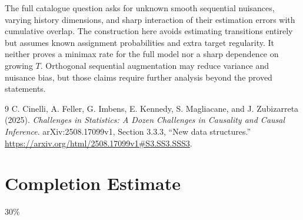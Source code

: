 \documentclass[11pt,a4paper]{article}
\theoremstyle{definition}
\theoremstyle{remark}
\begin{document}
The full catalogue question asks for unknown smooth sequential nuisances, varying history dimensions, and sharp interaction of their estimation errors with cumulative overlap. The construction here avoids estimating transitions entirely but assumes known assignment probabilities and extra target regularity. It neither proves a minimax rate for the full model nor a sharp dependence on growing $T$. Orthogonal sequential augmentation may reduce variance and nuisance bias, but those claims require further analysis beyond the proved statements.
\begin{thebibliography}{9}
 C. Cinelli, A. Feller, G. Imbens, E. Kennedy, S. Magliacane, and J. Zubizarreta (2025).
\emph{Challenges in Statistics: A Dozen Challenges in Causality and Causal Inference}. arXiv:2508.17099v1, Section 3.3.3, ``New data structures.''
\url{https://arxiv.org/html/2508.17099v1#S3.SS3.SSS3}.
\end{thebibliography}

\section{Completion Estimate}
30\%
\end{document}
